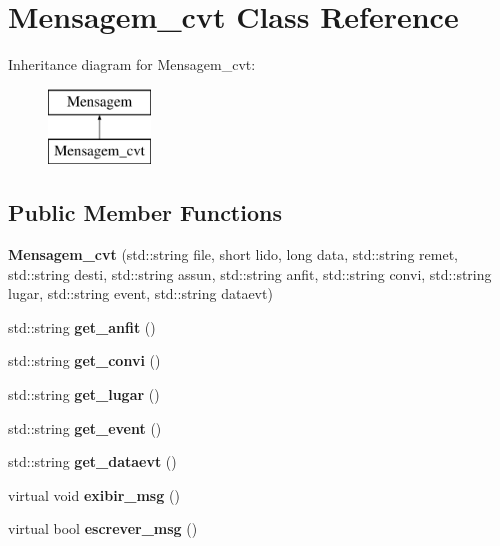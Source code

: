 \hypertarget{class_mensagem__cvt}{}\section{Mensagem\+\_\+cvt Class Reference}
\label{class_mensagem__cvt}
Inheritance diagram for Mensagem\+\_\+cvt\+:\begin{figure}[H]
\begin{center}
\leavevmode
\includegraphics[height=2.000000cm]{class_mensagem__cvt}
\end{center}
\end{figure}
\subsection*{Public Member Functions}
\begin{DoxyCompactItemize}
\item 
\mbox{\label{class_mensagem__cvt_acc305191d727a62b83f6329f437aa8b7}} 
{\bfseries Mensagem\+\_\+cvt} (std\+::string file, short lido, long data, std\+::string remet, std\+::string desti, std\+::string assun, std\+::string anfit, std\+::string convi, std\+::string lugar, std\+::string event, std\+::string dataevt)
\item 
\mbox{\label{class_mensagem__cvt_a5c556ff31cb505f619f25db42c4c5a2e}} 
std\+::string {\bfseries get\+\_\+anfit} ()
\item 
\mbox{\label{class_mensagem__cvt_a251e700863806fbfaa990bdf20cb1ce4}} 
std\+::string {\bfseries get\+\_\+convi} ()
\item 
\mbox{\label{class_mensagem__cvt_aa2dad5051348884cd9cdc7f09875c056}} 
std\+::string {\bfseries get\+\_\+lugar} ()
\item 
\mbox{\label{class_mensagem__cvt_a5a787bcd328d097147ffa6adb0bf7b25}} 
std\+::string {\bfseries get\+\_\+event} ()
\item 
\mbox{\label{class_mensagem__cvt_a4dcc8c40ee156e8e07bfd41df720bdc5}} 
std\+::string {\bfseries get\+\_\+dataevt} ()
\item 
\mbox{\label{class_mensagem__cvt_a114fd5b19b97c1e1060e8125b4411829}} 
virtual void {\bfseries exibir\+\_\+msg} ()
\item 
\mbox{\label{class_mensagem__cvt_a1b82fa770095d1a6ff063b875db00c08}} 
virtual bool {\bfseries escrever\+\_\+msg} ()
\end{DoxyCompactItemize}
